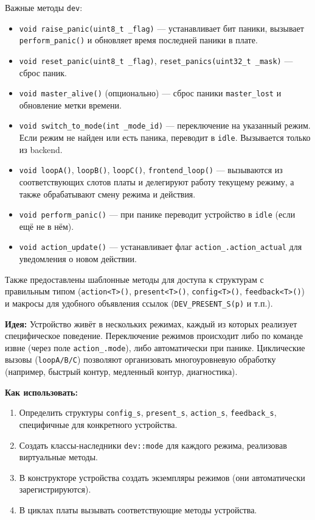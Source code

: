 \documentclass[a4paper,12pt]{article}
\begin{document}
Важные методы \texttt{dev}:
\begin{itemize}
    \item \texttt{void raise\_panic(uint8\_t \_flag)} — устанавливает бит паники, вызывает \texttt{perform\_panic()} и обновляет время последней паники в плате.
    \item \texttt{void reset\_panic(uint8\_t \_flag)}, \texttt{reset\_panics(uint32\_t \_mask)} — сброс паник.
    \item \texttt{void master\_alive()} (опционально) — сброс паники \texttt{master\_lost} и обновление метки времени.
    \item \texttt{void switch\_to\_mode(int \_mode\_id)} — переключение на указанный режим. Если режим не найден или есть паника, переводит в \texttt{idle}. Вызывается только из backend.
    \item \texttt{void loopA()}, \texttt{loopB()}, \texttt{loopC()}, \texttt{frontend\_loop()} — вызываются из соответствующих слотов платы и делегируют работу текущему режиму, а также обрабатывают смену режима и действия.
    \item \texttt{void perform\_panic()} — при панике переводит устройство в \texttt{idle} (если ещё не в нём).
    \item \texttt{void action\_update()} — устанавливает флаг \texttt{action\_.action\_actual} для уведомления о новом действии.
\end{itemize}

Также предоставлены шаблонные методы для доступа к структурам с правильным типом (\texttt{action<T>()}, \texttt{present<T>()}, \texttt{config<T>()}, \texttt{feedback<T>()}) и макросы для удобного объявления ссылок (\texttt{DEV\_PRESENT\_S(p)} и т.п.).

\textbf{Идея:} Устройство живёт в нескольких режимах, каждый из которых реализует специфическое поведение. Переключение режимов происходит либо по команде извне (через поле \texttt{action\_.mode}), либо автоматически при панике. Циклические вызовы (\texttt{loopA/B/C}) позволяют организовать многоуровневую обработку (например, быстрый контур, медленный контур, диагностика).

\textbf{Как использовать:}
\begin{enumerate}
    \item Определить структуры \texttt{config\_s}, \texttt{present\_s}, \texttt{action\_s}, \texttt{feedback\_s}, специфичные для конкретного устройства.
    \item Создать классы-наследники \texttt{dev::mode} для каждого режима, реализовав виртуальные методы.
    \item В конструкторе устройства создать экземпляры режимов (они автоматически зарегистрируются).
    \item В циклах платы вызывать соответствующие методы устройства.
\end{enumerate}
\end{document}
